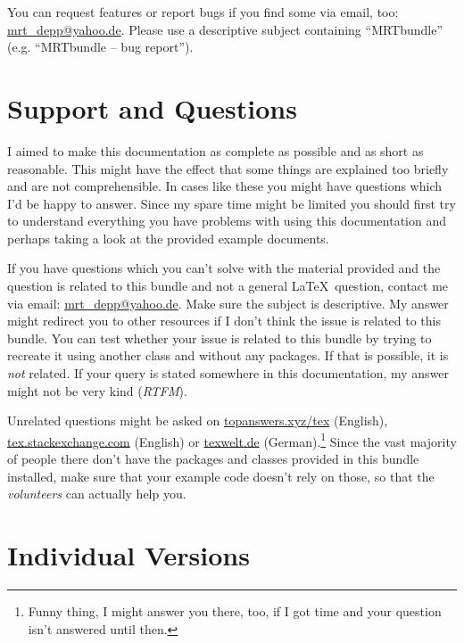 You can request features or report bugs if you find some via
email, too:
\href{mailto:mrt_depp@yahoo.de?subject=MRTbundle -- bug report}
  {mrt\_depp@yahoo.de}.
Please use a descriptive subject containing ``MRTbundle'' (e.g. ``MRTbundle --
bug report'').

\section{Support and Questions}
I aimed to make this documentation as complete as possible and as short as
reasonable. This might have the effect that some things are explained too
briefly and are not comprehensible. In cases like these you might have questions
which I'd be happy to answer. Since my spare time might be limited you should
first try to understand everything you have problems with using this
documentation and perhaps taking a look at the provided example documents.

If you have questions which you can't solve with the material provided and the
question is related to this bundle and not a general \LaTeX\ question, contact
me via email:
\href{mailto:mrt_depp@yahoo.de?subject=MRTbundle -- support}
  {mrt\_depp@yahoo.de}.
Make sure the subject is descriptive. My answer might redirect you to other
resources if I don't think the issue is related to this bundle. You can test
whether your issue is related to this bundle by trying to recreate it using
another class and without any  packages. If that is possible, it is
\emph{not} related. If your query is stated somewhere in this documentation, my
answer might not be very kind (\!\emph{RTFM}).

Unrelated questions might be asked on \url{topanswers.xyz/tex} (English),
\url{tex.stackexchange.com} (English) or \url{texwelt.de}
(German).\footnote{Funny thing, I might answer you there, too, if I got time and
your question isn't answered until then.} Since the vast majority of people
there don't have the packages and classes provided in this bundle installed,
make sure that your example code doesn't rely on those, so that the
\emph{volunteers} can actually help you.

\section{Individual Versions}
\docIndividualVersions
